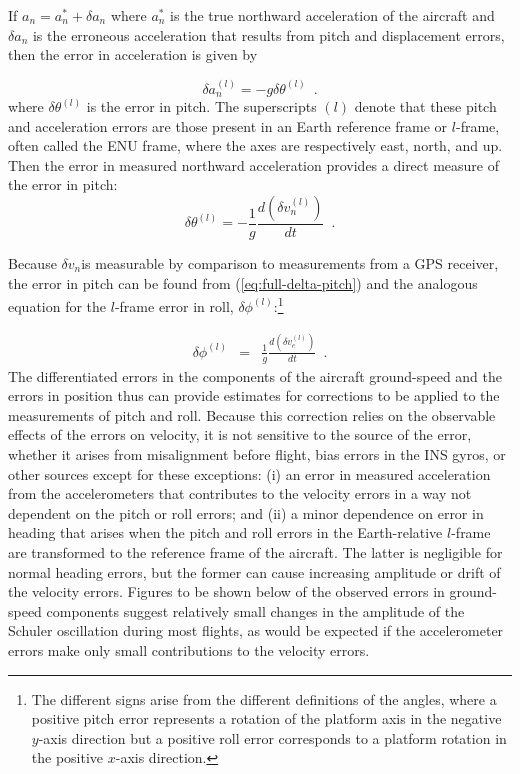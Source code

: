 \documentclass[english,british,amtd,bookmarks=false,unicode=true]{copernicus}\usepackage[]{graphicx}\usepackage[]{color}
\begin{document}
If $a_{n}=a_{n}^{*}+\delta a_{n}$ where $a_{n}^{*}$ is the true
northward acceleration of the aircraft and $\delta a_{n}$ is the
erroneous acceleration that results from pitch and displacement errors,
then the error in acceleration is given by

\begin{equation}
\delta a_{n}^{(l)}=-g\delta\theta^{(l)}\,\,\,.\label{eq:delta-an}
\end{equation}
where $\delta\theta^{(l)}$ is the error in pitch. The superscripts
$(l)$ denote that these pitch and acceleration errors are those present
in an Earth reference frame or $l$-frame, often called the ENU frame,
where the axes are respectively east, north, and up. Then the error
in measured northward acceleration provides a direct measure of the
error in pitch:\\
\begin{equation}
\delta\theta^{(l)}=-\frac{1}{g}\frac{d(\delta v_{n}^{(l)})}{dt}\,\,\,.\label{eq:full-delta-pitch}
\end{equation}


Because $\delta v_{n}$is measurable by comparison to measurements
from a GPS receiver, the error in pitch can be found from (\ref{eq:full-delta-pitch})
and the analogous equation for the $l$-frame error in roll, $\delta\phi^{(l)}$:\footnote{The different signs arise from the different definitions of the angles,
where a positive pitch error represents a rotation of the platform
axis in the negative $y$-axis direction but a positive roll error
corresponds to a platform rotation in the positive $x$-axis direction.}

\begin{eqnarray}
\delta\phi^{(l)} & = & \frac{1}{g}\frac{d(\delta v_{e}^{(l)})}{dt}\,\,\,.\label{eq:delta-phi}
\end{eqnarray}
The differentiated errors in the components of the aircraft ground-speed
and the errors in position thus can provide estimates for corrections
to be applied to the measurements of pitch and roll. Because this
correction relies on the observable effects of the errors on velocity,
it is not sensitive to the source of the error, whether it arises
from misalignment before flight, bias errors in the INS gyros, or
other sources except for these exceptions: (i) an error in measured
acceleration from the accelerometers that contributes to the velocity
errors in a way not dependent on the pitch or roll errors; and (ii)
a minor dependence on error in heading that arises when the pitch
and roll errors in the Earth-relative $l$-frame are transformed to
the reference frame of the aircraft. The latter is negligible for
normal heading errors, but the former can cause increasing amplitude
or drift of the velocity errors. Figures to be shown below of the
observed errors in ground-speed components suggest relatively small
changes in the amplitude of the Schuler oscillation during most flights,
as would be expected if the accelerometer errors make only small contributions
to the velocity errors.
\end{document}
